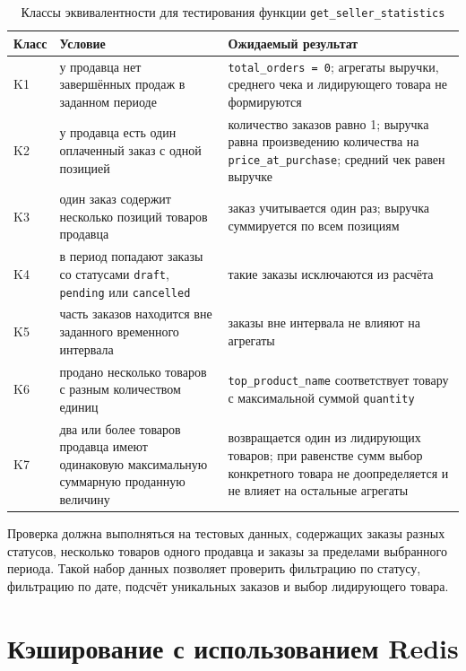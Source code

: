 \begin{table}[H]
    \caption{Классы эквивалентности для тестирования функции \texttt{get\_seller\_statistics}}
    \label{tbl:stats_equiv}
    \begin{tabular}{|p{}|p{}|p{}|}
        \hline
        \textbf{Класс} & \textbf{Условие} & \textbf{Ожидаемый результат} \\ \hline
        K1 & у продавца нет завершённых продаж в заданном периоде & \texttt{total\_orders = 0}; агрегаты выручки, среднего чека и лидирующего товара не формируются \\ \hline
        K2 & у продавца есть один оплаченный заказ с одной позицией & количество заказов равно 1; выручка равна произведению количества на \texttt{price\_at\_purchase}; средний чек равен выручке \\ \hline
        K3 & один заказ содержит несколько позиций товаров продавца & заказ учитывается один раз; выручка суммируется по всем позициям \\ \hline
        K4 & в период попадают заказы со статусами \texttt{draft}, \texttt{pending} или \texttt{cancelled} & такие заказы исключаются из расчёта \\ \hline
        K5 & часть заказов находится вне заданного временного интервала & заказы вне интервала не влияют на агрегаты \\ \hline
        K6 & продано несколько товаров с разным количеством единиц & \texttt{top\_product\_name} соответствует товару с максимальной суммой \texttt{quantity} \\ \hline
        K7 & два или более товаров продавца имеют одинаковую максимальную суммарную проданную величину & возвращается один из лидирующих товаров; при равенстве сумм выбор конкретного товара не доопределяется и не влияет на остальные агрегаты \\ \hline
    \end{tabular}
\end{table}

Проверка должна выполняться на тестовых данных, содержащих заказы разных статусов, несколько товаров одного продавца и заказы за пределами выбранного периода. Такой набор данных позволяет проверить фильтрацию по статусу, фильтрацию по дате, подсчёт уникальных заказов и выбор лидирующего товара.

\section{Кэширование с использованием Redis}

